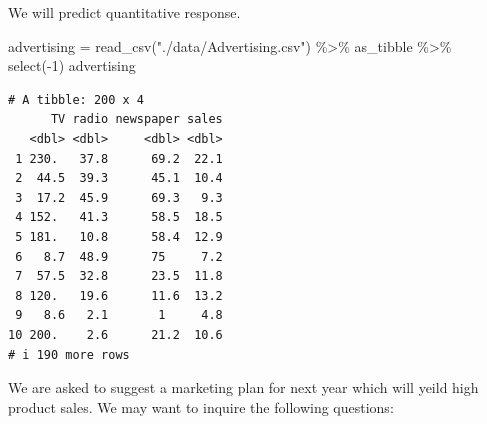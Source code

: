 \documentclass[
  letterpaper,
  DIV=11,
  numbers=noendperiod]{scrreprt}
\newenvironment{Shaded}{\begin{snugshade}}{\end{snugshade}}
\newcommand{\DecValTok}[1]{\textcolor[rgb]{0.47,0.16,0.63}{#1}}
\newcommand{\FunctionTok}[1]{\textcolor[rgb]{0.02,0.16,0.49}{#1}}
\newcommand{\NormalTok}[1]{\textcolor[rgb]{0.33,0.33,0.33}{#1}}
\newcommand{\OtherTok}[1]{\textcolor[rgb]{0.85,0.12,0.09}{#1}}
\newcommand{\SpecialCharTok}[1]{\textcolor[rgb]{0.00,0.46,0.62}{#1}}
\newcommand{\StringTok}[1]{\textcolor[rgb]{0.00,0.50,0.00}{#1}}
\begin{document}
We will predict quantitative response.

\begin{Shaded}
\begin{Highlighting}[]
\NormalTok{advertising }\OtherTok{=} \FunctionTok{read\_csv}\NormalTok{(}\StringTok{"./data/Advertising.csv"}\NormalTok{) }\SpecialCharTok{\%\textgreater{}\%}\NormalTok{ as\_tibble }\SpecialCharTok{\%\textgreater{}\%} \FunctionTok{select}\NormalTok{(}\SpecialCharTok{{-}}\DecValTok{1}\NormalTok{)}
\NormalTok{advertising}
\end{Highlighting}
\end{Shaded}

\begin{verbatim}
# A tibble: 200 x 4
      TV radio newspaper sales
   <dbl> <dbl>     <dbl> <dbl>
 1 230.   37.8      69.2  22.1
 2  44.5  39.3      45.1  10.4
 3  17.2  45.9      69.3   9.3
 4 152.   41.3      58.5  18.5
 5 181.   10.8      58.4  12.9
 6   8.7  48.9      75     7.2
 7  57.5  32.8      23.5  11.8
 8 120.   19.6      11.6  13.2
 9   8.6   2.1       1     4.8
10 200.    2.6      21.2  10.6
# i 190 more rows
\end{verbatim}

We are asked to suggest a marketing plan for next year which will yeild
high product sales. We may want to inquire the following questions:
\end{document}
